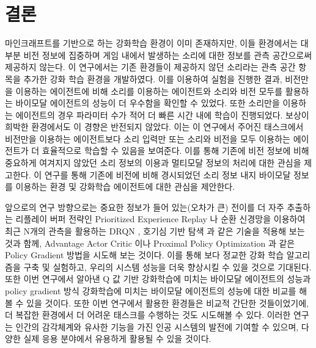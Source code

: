 \documentclass[oneside, under, ko]{snuthesis}
\begin{document}
\chapter{결론}\label{chp:conclusion}

마인크래프트를 기반으로 하는 강화학습 환경이 이미 존재하지만, 이들 환경에서는 대부분 비전 정보에 집중하며 게임 내에서 발생하는 소리에 대한 정보를 관측 공간으로써 제공하지 않는다. 이 연구에서는 기존 환경들이 제공하지 않던 소리라는 관측 공간 항목을 추가한 강화 학습 환경을 개발하였다.  이를 이용하여 실험을 진행한 결과, 비전만을 이용하는 에이전트에 비해 소리를 이용하는 에이전트와 소리와 비전 모두를 활용하는 바이모달 에이전트의 성능이 더 우수함을 확인할 수 있었다. 또한 소리만을 이용하는 에이전트의 경우 파라미터 수가 적어 더 빠른 시간 내에 학습이 진행되었다. 보상이 희박한 환경에서도 이 경향은 반전되지 않았다. 이는 이 연구에서 주어진 태스크에서 비전만을 이용하는 에이전트보다 소리 입력만 또는 소리와 비전을 모두 이용하는 에이전트가 더 효율적으로 학습할 수 있음을 보여준다. 이를 통해 기존에 비전 정보에 비해 중요하게 여겨지지 않았던 소리 정보의 이용과 멀티모달 정보의 처리에 대한 관심을 제고한다. 이 연구를 통해 기존에 비전에 비해 경시되었던 소리 정보 내지 바이모달 정보를 이용하는 환경 및 강화학습 에이전트에 대한 관심을 제안한다.

앞으로의 연구 방향으로는 중요한 정보가 들어 있는(오차가 큰) 전이를 더 자주 추출하는 리플레이 버퍼 전략인 Prioritized Experience Replay \cite{per}나 순환 신경망을 이용하여 최근 N개의 관측을 활용하는 DRQN \cite{POMDP}, 호기심 기반 탐색 \cite{curious}과 같은 기술을 적용해 보는 것과 함께, Advantage Actor Critic \cite{A2C}이나 Proximal Policy Optimization \cite{PPO}과 같은 Policy Gradient 방법을 시도해 보는 것이다. 이를 통해 보다 정교한 강화 학습 알고리즘을 구축 및 실험하고, 우리의 시스템 성능을 더욱 향상시킬 수 있을 것으로 기대된다. 또한 이번 연구에서 알아낸 Q 값 기반 강화학습에 미치는 바이모달 에이전트의 성능과 policy gradient 방식 강화학습에 미치는 바이모달 에이전트의 성능에 대한 비교를 해볼 수 있을 것이다. 또한 이번 연구에서 활용한 환경들은 비교적 간단한 것들이었기에, 더 복잡한 환경에서 더 어려운 태스크를 수행하는 것도 시도해볼 수 있다. 이러한 연구는 인간의 감각체계와 유사한 기능을 가진 인공 시스템의 발전에 기여할 수 있으며, 다양한 실제 응용 분야에서 유용하게 활용될 수 있을 것이다.
\end{document}
